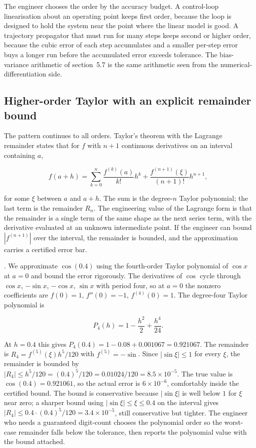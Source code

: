 The engineer chooses the order by the accuracy budget. A
control-loop linearisation about an operating point keeps first
order, because the loop is designed to hold the system near the
point where the linear model is good. A trajectory propagator that
must run for many steps keeps second or higher order, because the
cubic error of each step accumulates and a smaller per-step error
buys a longer run before the accumulated error exceeds tolerance.
The bias-variance arithmetic of section~5.7 is the same arithmetic
seen from the numerical-differentiation side.

\subsection{Higher-order Taylor with an explicit remainder bound}

The pattern continues to all orders. Taylor's theorem with the
Lagrange remainder states that for $f$ with $n + 1$ continuous
derivatives on an interval containing $a$,

\[
f(a + h) = \sum_{k=0}^{n} \frac{f^{(k)}(a)}{k!} h^{k} +
\frac{f^{(n+1)}(\xi)}{(n+1)!} h^{n+1},
\]

for some $\xi$ between $a$ and $a + h$. The sum is the degree-$n$
Taylor polynomial; the last term is the remainder $R_{n}$. The
engineering value of the Lagrange form is that the remainder is a
single term of the same shape as the next series term, with the
derivative evaluated at an unknown intermediate point. If the
engineer can bound $|f^{(n+1)}|$ over the interval, the remainder
is bounded, and the approximation carries a certified error bar.

. We approximate $\cos(0.4)$ using the
fourth-order Taylor polynomial of $\cos x$ at $a = 0$ and bound the
error rigorously. The derivatives of $\cos$ cycle through $\cos x$,
$-\sin x$, $-\cos x$, $\sin x$ with period four, so at $a = 0$ the
nonzero coefficients are $f(0) = 1$, $f''(0) = -1$, $f^{(4)}(0) =
1$. The degree-four Taylor polynomial is

\[
P_{4}(h) = 1 - \frac{h^{2}}{2} + \frac{h^{4}}{24}.
\]

At $h = 0.4$ this gives $P_{4}(0.4) = 1 - 0.08 + 0.001067 =
0.921067$. The remainder is $R_{4} = f^{(5)}(\xi) h^{5}/120$ with
$f^{(5)} = -\sin$. Since $|\sin\xi| \leq 1$ for every $\xi$, the
remainder is bounded by $|R_{4}| \leq h^{5}/120 = (0.4)^{5}/120 =
0.01024/120 = 8.5 \times 10^{-5}$. The true value is
$\cos(0.4) = 0.921061$, so the actual error is $6 \times 10^{-6}$,
comfortably inside the certified bound. The bound is conservative
because $|\sin\xi|$ is well below $1$ for $\xi$ near zero; a sharper
bound using $|\sin\xi| \leq \xi \leq 0.4$ on the interval gives
$|R_{4}| \leq 0.4 \cdot (0.4)^{5}/120 = 3.4 \times 10^{-5}$, still
conservative but tighter. The engineer who needs a guaranteed
digit-count chooses the polynomial order so the worst-case
remainder falls below the tolerance, then reports the polynomial
value with the bound attached.

